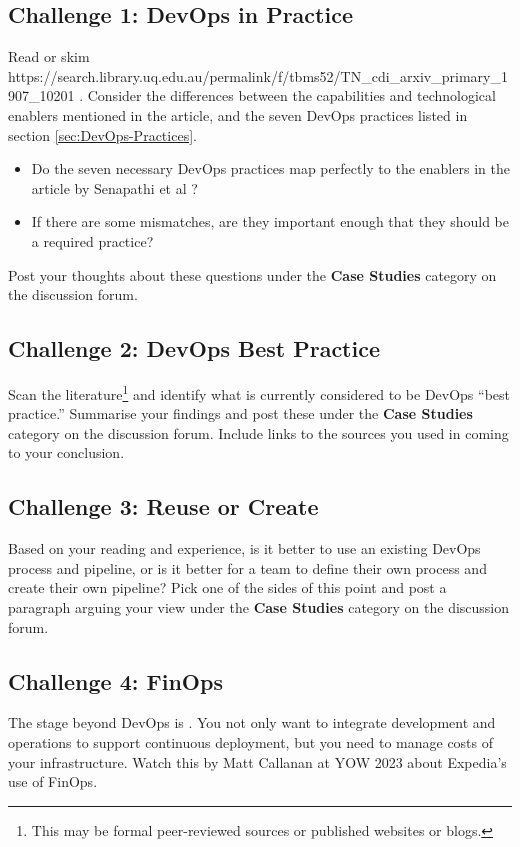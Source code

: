\documentclass{csse4400}
\begin{document}
\subsection*{Challenge 1: DevOps in Practice}
Read or skim 
{https://search.library.uq.edu.au/permalink/f/tbms52/TN_cdi_arxiv_primary_1907_10201}
\cite{SenapathiMali2018DCPa}.
Consider the differences between the capabilities and technological enablers mentioned in the article,
and the seven DevOps practices listed in section \ref{sec:DevOps-Practices}.
\begin{itemize}
    \item Do the seven necessary DevOps practices map perfectly to the enablers in the article by Senapathi et al \cite{SenapathiMali2018DCPa}?
    \item If there are some mismatches, are they important enough that they should be a required practice?
\end{itemize}

\noindent
Post your thoughts about these questions under the \textbf{Case Studies} category on the discussion forum.

\subsection*{Challenge 2: DevOps Best Practice}
Scan the literature\footnote{This may be formal peer-reviewed sources or published websites or blogs.}
and identify what is currently considered to be DevOps ``best practice.''
Summarise your findings and post these under the \textbf{Case Studies} category on the discussion forum.
Include links to the sources you used in coming to your conclusion.

\subsection*{Challenge 3: Reuse or Create}
Based on your reading and experience, is it better to use an existing DevOps process and pipeline,
or is it better for a team to define their own process and create their own pipeline?
Pick one of the sides of this point and post a paragraph arguing your view
under the \textbf{Case Studies} category on the discussion forum.

\subsection*{Challenge 4: FinOps}
The stage beyond DevOps is .
You not only want to integrate development and operations to support continuous deployment,
but you need to manage costs of your infrastructure.
Watch this  by Matt Callanan at YOW 2023 about Expedia's use of FinOps.



\end{document}
